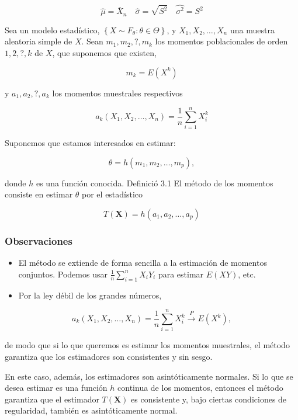 \documentclass[
]{article}
\providecommand{\tightlist}{%
  \setlength{\itemsep}{0pt}\setlength{\parskip}{0pt}}
\begin{document}
\[
\widehat{\mu}=\bar{X}_{n} \quad \widehat{\sigma}=\sqrt{S^{2}} \quad \widehat{\sigma^{2}}=S^{2}
\]

Sea un modelo estadístico, \(\left\{X \sim F_{\theta}: \theta \in \Theta\right\}\), y \(X_{1}, X_{2}, \ldots, X_{n}\) una muestra aleatoria simple de \(X\). Sean \(m_{1}, m_{2}, ?, m_{k}\) los momentos poblacionales de orden \(1,2, ?, k\) de \(X\), que suponemos que existen,

\[
m_{k}=E\left(X^{k}\right)
\]

y \(a_{1}, a_{2}, ?, a_{k}\) los momentos muestrales respectivos

\[
a_{k}\left(X_{1}, X_{2}, \ldots, X_{n}\right)=\frac{1}{n} \sum_{i=1}^{n} X_{i}^{k}
\]

Suponemos que estamos interesados en estimar:

\[
\theta=h\left(m_{1}, m_{2}, \ldots, m_{p}\right),
\]

donde \(h\) es una función conocida.
Definició 3.1 El método de los momentos consiste en estimar \(\theta\) por el estadístico

\[
T(\mathbf{X})=h\left(a_{1}, a_{2}, \ldots, a_{p}\right)
\]

\subsubsection{Observaciones}\label{observaciones-1}

\begin{itemize}
\tightlist
\item
  El método se extiende de forma sencilla a la estimación de momentos conjuntos. Podemos usar \(\frac{1}{n} \sum_{i=1}^{n} X_{i} Y_{i}\) para estimar \(E(X Y)\), etc.
\item
  Por la ley débil de los grandes números,
\end{itemize}

\[
a_{k}\left(X_{1}, X_{2}, \ldots, X_{n}\right)=\frac{1}{n} \sum_{i=1}^{n} X_{i}^{k} \xrightarrow{P} E\left(X^{k}\right),
\]

de modo que si lo que queremos es estimar los momentos muestrales, el método garantiza que los estimadores son consistentes y sin sesgo.

En este caso, además, los estimadores son asintóticamente normales. Si lo que se desea estimar es una función \(h\) continua de los momentos, entonces el método garantiza que el estimador \(T(\mathbf{X})\) es consistente y, bajo ciertas condiciones de regularidad, también es asintóticamente normal.
\end{document}
